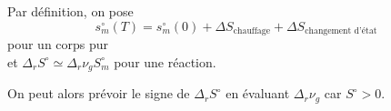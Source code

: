 ﻿\documentclass[a4paper]{article}
\begin{document}
\pagestyle{fancy}
\fancyhf{}
\setlength{\headheight}{15pt}

\begin{center}
	\large{}
\end{center}



Par définition, on pose \[s_m^{\circ}(T)=s_m^{\circ}(0)+\Delta S_{\mathrm{chauffage}}+\Delta S_{\text{changement d'état}}\] pour un corps pur \\
et \(\Delta_rS^{\circ}\simeq\Delta_r\nu_gS_m^{\circ}\) pour une réaction.

On peut alors prévoir le signe de \(\Delta_rS^{\circ}\) en évaluant \(\Delta_r\nu_g\) car \(S^{\circ}>0\).
\end{document}
